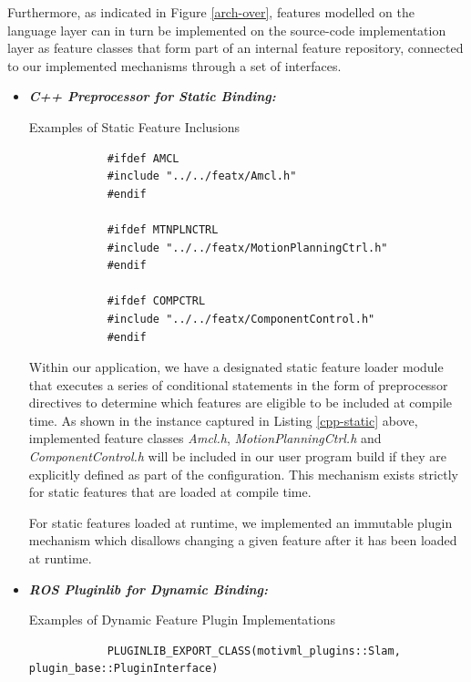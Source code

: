 \documentclass[conference]{IEEEtran}
\begin{document}
Furthermore, as indicated in Figure \ref{arch-over}, features modelled on the language layer can in turn be implemented on the source-code implementation layer as feature classes that form part of an internal feature repository, connected to our implemented mechanisms through a set of interfaces.\\
\begin{itemize}
	\item \textit{\textbf{C++ Preprocessor for Static Binding:}}
	\begin{listing}[H]
		\caption{Examples of Static Feature Inclusions}
		\begin{verbatim}
			#ifdef AMCL
			#include "../../featx/Amcl.h"
			#endif
			
			#ifdef MTNPLNCTRL
			#include "../../featx/MotionPlanningCtrl.h"
			#endif
			
			#ifdef COMPCTRL
			#include "../../featx/ComponentControl.h"
			#endif
		\end{verbatim}
		\label{cpp-static}
	\end{listing}

Within our application, we have a designated static feature loader module that executes a series of conditional statements in the form of preprocessor directives to determine which features are eligible to be included at compile time. As shown in the instance captured in Listing \ref{cpp-static} above, implemented feature classes \textit{Amcl.h}, \textit{MotionPlanningCtrl.h} and \textit{ComponentControl.h} will be included in our user program build if they are explicitly defined as part of the configuration. This mechanism exists strictly for static features that are loaded at compile time.

For static features loaded at runtime, we implemented an immutable plugin mechanism which disallows changing a given feature after it has been loaded at runtime.\\

\item \textit{\textbf{ROS Pluginlib for Dynamic Binding:}}
	\begin{listing}[H]
		\caption{Examples of Dynamic Feature Plugin Implementations}
		\begin{verbatim}
			PLUGINLIB_EXPORT_CLASS(motivml_plugins::Slam, plugin_base::PluginInterface)
			

\end{verbatim}
\end{listing}
\end{itemize}
\end{document}
